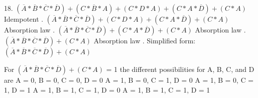 \documentclass{article}
\begin{document}
\begin{itemize}
    18. $(\overline{A} * \overline{B} * \overline{C} * \overline{D}) +
    (C * \overline{B} * A) + (C * D * A) + (C * A * \overline{D}) + (C * A)$ Idempotent . $(\overline{A} * \overline{B} * \overline{C} * \overline{D}) + 
    (C * D * A) + (C * A * \overline{D}) + (C * A)$ Absorption law . $(\overline{A} * \overline{B} * \overline{C} * \overline{D}) + 
    (C * A * \overline{D}) + (C * A)$ Absorption law . $(\overline{A} * \overline{B} * \overline{C} * \overline{D}) + 
    (C * A)$ Absorption law . Simplified form: $(\overline{A} * \overline{B} * \overline{C} * \overline{D}) + (C * A)$ \newline
    
    For $(\overline{A} * \overline{B} * \overline{C} * \overline{D}) + 
    (C * A)$ = 1 the different possibilities for A, B, C, and D are \newline
    {A = 0, B = 0, C = 0, D = 0} \newline
    {A = 1, B = 0, C = 1, D = 0} \newline
    {A = 1, B = 0, C = 1, D = 1} \newline
    {A = 1, B = 1, C = 1, D = 0} \newline
    {A = 1, B = 1, C = 1, D = 1} \newline
    

\end{itemize}
\end{document}
